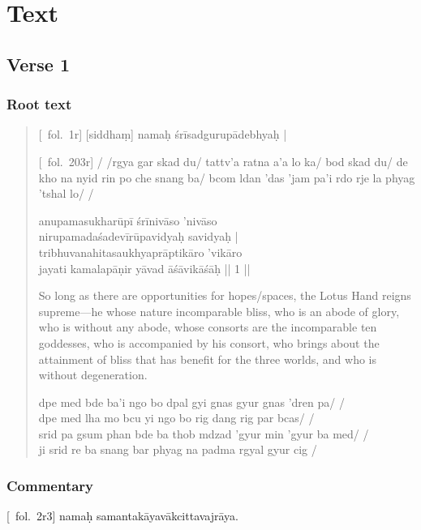 \documentclass[12pt]{article}
\newcommand{\emdash} {\hspace{0em}—\hspace{0em}}
\begin{document}
\section{Text}
\subsection{Verse 1}
\subsubsection{Root text}
\begin{quote}
	[\MS\ fol.\ 1r] [siddhaṃ]\footnoteB{
		[siddhaṃ]] \MS ; oṁ \EDD
	} namaḥ śrīsadgurupādebhyaḥ |
	
	[\TM\ fol.\ 203r] / /rgya gar skad du/ tattv'a ratna a'a lo ka/ bod skad du/ de kho na nyid rin po che snang ba/ bcom ldan 'das 'jam pa'i rdo rje la phyag 'tshal lo/ /

	anupamasukharūpī śrīnivāso 'nivāso \\
	nirupamadaśadevīrūpavidyaḥ\footnoteB{
		nirupama°] \EDD\ ; nirūpama° \MS
	} savidyaḥ |\\
	tribhuvanahitasaukhyaprāptikāro 'vikāro \\
	jayati kamalapāṇir yāvad āśāvikāśāḥ\footnoteB{
		āśāvikāśāḥ] \corr ; āśāvikāsāḥ \MS\ \EDD
	} || 1 ||
	
	So long as there are opportunities for hopes/spaces, the Lotus Hand reigns supreme\emdash he whose nature incomparable bliss, who is an abode of glory, who is without any abode, whose consorts are the incomparable ten goddesses, who is accompanied by his consort, who brings about the attainment of bliss that has benefit for the three worlds, and who is without degeneration.
	
	dpe med bde ba'i ngo bo dpal gyi gnas gyur gnas 'dren pa/ /\\
	dpe med lha mo bcu yi ngo bo rig dang rig par bcas/ /\\
	srid pa gsum phan bde ba thob mdzad 'gyur min 'gyur ba med/ /\\
	ji srid re ba snang bar phyag na padma rgyal gyur cig /
\end{quote}

\subsubsection{Commentary}
[\MS\ fol.\ 2r3] namaḥ samantakāyavākcittavajrāya.\\
\end{document}
